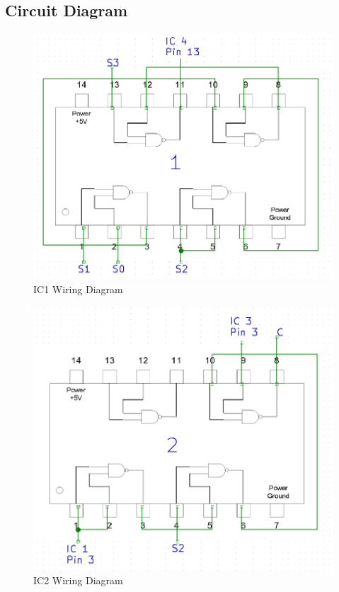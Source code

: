 \documentclass[11pt,a4paper]{article}
\begin{document}
\subsection{Circuit Diagram}
\begin{figure}[H]
    \centering
    \includegraphics[width=5in]{IC1.png}
    \caption{IC1 Wiring Diagram}
\end{figure}
\begin{figure}[H]
    \centering
    \includegraphics[width=5in]{IC2.png}
    \caption{IC2 Wiring Diagram}
\end{figure}
\end{document}

